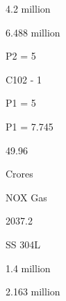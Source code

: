 \documentclass[a4paper,portrait,12pt]{article}
\begin{document}
\begin{flushleft}
4.2 million
\end{flushleft}





\begin{flushleft}
6.488 million
\end{flushleft}





\begin{flushleft}
P2 = 5
\end{flushleft}


\begin{flushleft}
C102 - 1
\end{flushleft}





\begin{flushleft}
P1 = 5
\end{flushleft}





\begin{flushleft}
P1 = 7.745
\end{flushleft}





49.96


\begin{flushleft}
Crores
\end{flushleft}





\begin{flushleft}
NOX Gas
\end{flushleft}





2037.2





\begin{flushleft}
SS 304L
\end{flushleft}





\begin{flushleft}
1.4 million
\end{flushleft}





\begin{flushleft}
2.163 million
\end{flushleft}
\end{document}
